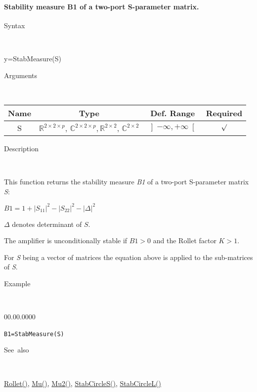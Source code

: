 \paragraph{\label{par:StabMeasure}Stability measure B1 of a two-port S-parameter matrix.}

\begin{description}
\item [Syntax]~
\end{description}
y=StabMeasure(S)

\begin{description}
\item [Arguments]~
\end{description}
\begin{tabular}{|c|c|c|c|}
\hline 
Name&
Type&
Def. Range&
Required\tabularnewline
\hline
\hline 
S&
$\mathbb{R}^{2\times2\times p}$, $\mathbb{C}^{2\times2\times p},$$\mathbb{R}^{2\times2}$,
$\mathbb{C}^{2\times2}$&
$\left]-\infty,+\infty\right[$&
$\surd$\tabularnewline
\hline
\end{tabular}

\begin{description}
\item [Description]~
\end{description}
This function returns the stability measure \textit{B1} of a two-port S-parameter matrix \textit{S}: 

\medskip{}
\noindent $B1={\displaystyle {1+\left|S_{11}\right|^{2}-\left|S_{22}\right|^{2}-\left|\Delta\right|^{2}}}$
\medskip{}

$\Delta$ denotes determinant of $S$.

\noindent The amplifier is unconditionally stable if $B1>0$ and the Rollet factor $K>1$.

\noindent For \textit{S} being a vector of matrices the equation above
is applied to the sub-matrices of \textit{S}.

\begin{description}
\item [Example]~
\end{description}
\begin{lyxlist}{00.00.0000}
\item [\texttt{B1=StabMeasure(S)}]~
\end{lyxlist}
\begin{description}
\item [See~also]~
\end{description}
\textcolor{blue}{\hyperlink{Rollet}{Rollet()}}\textcolor{black}{,}
\textcolor{blue}{\hyperlink{Mu}{Mu()}}\textcolor{black}{,} \textcolor{blue}{\hyperlink{Mu2}{Mu2()}}\textcolor{black}{,}
\textcolor{blue}{\hyperlink{StabCircleS}{StabCircleS()}}\textcolor{black}{,}
\textcolor{blue}{\hyperlink{StabCircleL}{StabCircleL()}}


